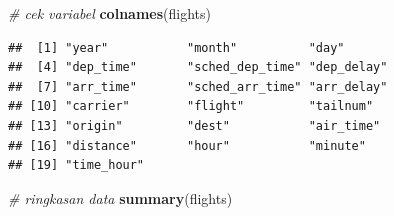 \documentclass[]{book}
\newenvironment{Shaded}{\begin{snugshade}}{\end{snugshade}}
\newcommand{\KeywordTok}[1]{\textcolor[rgb]{0.13,0.29,0.53}{\textbf{#1}}}
\newcommand{\CommentTok}[1]{\textcolor[rgb]{0.56,0.35,0.01}{\textit{#1}}}
\newcommand{\NormalTok}[1]{#1}
\begin{document}
\begin{Shaded}
\begin{Highlighting}[]
\CommentTok{# cek variabel}
\KeywordTok{colnames}\NormalTok{(flights)}
\end{Highlighting}
\end{Shaded}

\begin{verbatim}
##  [1] "year"           "month"          "day"           
##  [4] "dep_time"       "sched_dep_time" "dep_delay"     
##  [7] "arr_time"       "sched_arr_time" "arr_delay"     
## [10] "carrier"        "flight"         "tailnum"       
## [13] "origin"         "dest"           "air_time"      
## [16] "distance"       "hour"           "minute"        
## [19] "time_hour"
\end{verbatim}

\begin{Shaded}
\begin{Highlighting}[]
\CommentTok{# ringkasan data}
\KeywordTok{summary}\NormalTok{(flights)}
\end{Highlighting}
\end{Shaded}
\end{document}
